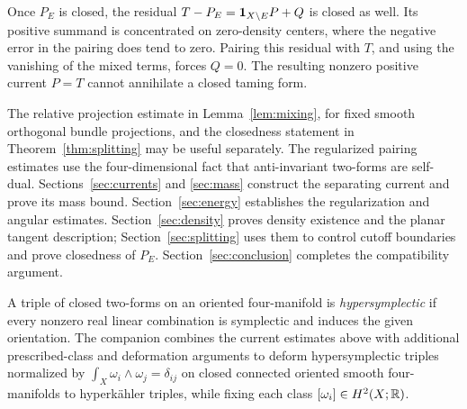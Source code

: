 Once \(P_E\) is closed, the residual
\(T-P_E=\mathbf 1_{X\setminus E}P+Q\) is closed as well. Its positive
summand is concentrated on zero-density centers, where the
negative error in the pairing does tend to zero. Pairing this residual
with \(T\), and using the vanishing of the mixed terms, forces
\(Q=0\). The resulting nonzero positive current \(P=T\)
cannot annihilate a closed taming form.

The relative projection estimate in Lemma~\ref{lem:mixing}, for
fixed smooth orthogonal bundle projections, and the closedness
statement in Theorem~\ref{thm:splitting} may be useful separately.
The regularized pairing estimates use the four-dimensional fact
that anti-invariant two-forms are self-dual.
Sections~\ref{sec:currents} and \ref{sec:mass} construct the
separating current and prove its mass bound.
Section~\ref{sec:energy} establishes the regularization and
angular estimates. Section~\ref{sec:density} proves density
existence and the planar tangent description;
Section~\ref{sec:splitting} uses them to control cutoff boundaries
and prove closedness of \(P_E\).
Section~\ref{sec:conclusion} completes the compatibility argument.

A triple of closed two-forms on an oriented four-manifold is
\emph{hypersymplectic} if every nonzero real linear combination is
symplectic and induces the given orientation. The companion
\cite[Theorem~1.1]{OpenAIHypersymplectic2026} combines the current
estimates above with additional prescribed-class and deformation
arguments to deform hypersymplectic triples normalized by
\(\int_X\omega_i\wedge\omega_j=\delta_{ij}\) on closed connected oriented
smooth four-manifolds to hyperk\"ahler triples, while fixing each class
\([\omega_i]\in H^2(X;\mathbb R)\).
